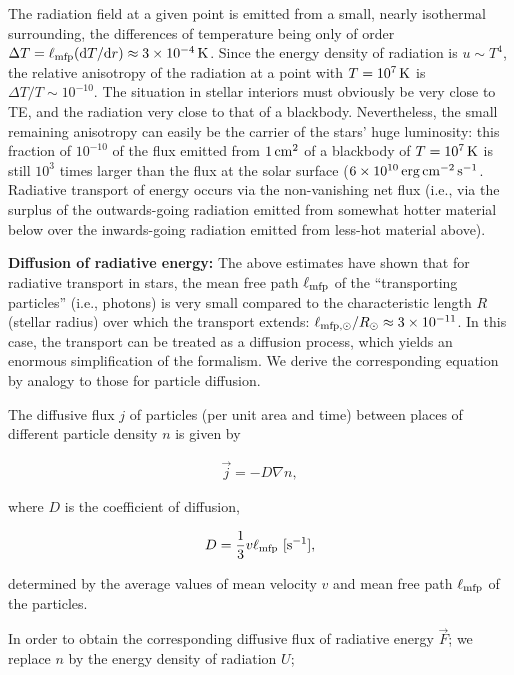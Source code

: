 \documentclass[a4paper,10pt]{article}
\begin{document}
{\noindent}The radiation field at a given point is emitted from a small, nearly isothermal surrounding, the differences of temperature being only of order $\Delta T=\ell_{\rm mfp}({\rm d}T/{\rm d}r)\approx3\times10^{-4}\,{\rm K}$. Since the energy density of radiation is $u\sim T^4$, the relative anisotropy of the radiation at a point with $T=10^7\,{\rm K}$ is $\Delta T/T\sim10^{-10}$. The situation in stellar interiors must obviously be very close to TE, and the radiation very close to that of a blackbody. Nevertheless, the small remaining anisotropy can easily be the carrier of the stars' huge luminosity: this fraction of $10^{-10}$ of the flux emitted from ${\rm 1\,cm^2}$ of a blackbody of $T=10^7\,{\rm K}$ is still $10^3$ times larger than the flux at the solar surface ($6\times10^{10}\,{\rm erg\,cm^{-2}\,s^{-1}}$. Radiative transport of energy occurs via the non-vanishing net flux (i.e., via the surplus of the outwards-going radiation emitted from somewhat hotter material below over the inwards-going radiation emitted from less-hot material above).

{\noindent}\textbf{Diffusion of radiative energy:} The above estimates have shown that for radiative transport in stars, the mean free path $\ell_{\rm mfp}$ of the ``transporting particles'' (i.e., photons) is very small compared to the characteristic length $R$ (stellar radius) over which the transport extends: $\ell_{\rm mfp,\odot}/R_\odot\approx3\times10^{-11}$. In this case, the transport can be treated as a diffusion process, which yields an enormous simplification of the formalism. We derive the corresponding equation by analogy to those for particle diffusion.

{\noindent}The diffusive flux $j$ of particles (per unit area and time) between places of different particle density $n$ is given by

\begin{align*}
    \vec{j} = -D\nabla n,
\end{align*}

{\noindent}where $D$ is the coefficient of diffusion,

\begin{align*}
    D = \frac{1}{3}v\ell_{\rm mfp} ~ [{\rm s^{-1}}],
\end{align*}

{\noindent}determined by the average values of mean velocity $v$ and mean free path $\ell_{\rm mfp}$ of the particles.

{\noindent}In order to obtain the corresponding diffusive flux of radiative energy $\vec{F}$; we replace $n$ by the energy density of radiation $U$;
\end{document}
